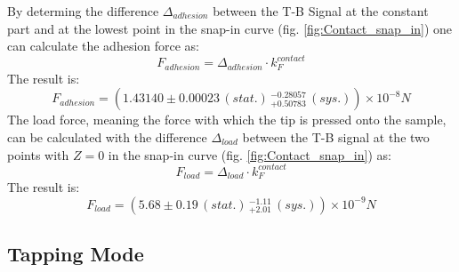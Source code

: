 \documentclass[%
 reprint,
amsmath,amssymb,
pra,
]{revtex4-1}
\begin{document}
By determing the difference $\Delta _{adhesion}$ between the T-B Signal at the constant part and at the lowest point in the snap-in curve (fig. \ref{fig:Contact_snap_in}) one can calculate the adhesion force as:
\begin{equation*}
F_{adhesion} = \Delta _{adhesion} \cdot k_F^{contact}
\end{equation*}
The result is:
\begin{equation*}
F_{adhesion} = (1.43140 \pm 0.00023 \, (stat.) \, _{+ 0.50783} ^{- 0.28057} \, (sys.)) \times 10^{-8} \si{N}
\end{equation*}
The load force, meaning the force with which the tip is pressed onto the sample, can be calculated with the difference $\Delta _{load}$ between the T-B signal at the two points with $Z=0$ in the snap-in curve (fig. \ref{fig:Contact_snap_in}) as:
\begin{equation*}
F_{load} = \Delta _{load} \cdot k_F^{contact}
\end{equation*}
The result is:
\begin{equation*}
F_{load} = (5.68 \pm 0.19 \, (stat.) \, _{+ 2.01} ^{- 1.11} \, (sys.)) \times 10^{-9} \si{N}
\end{equation*}


\subsection{Tapping Mode}
\end{document}
